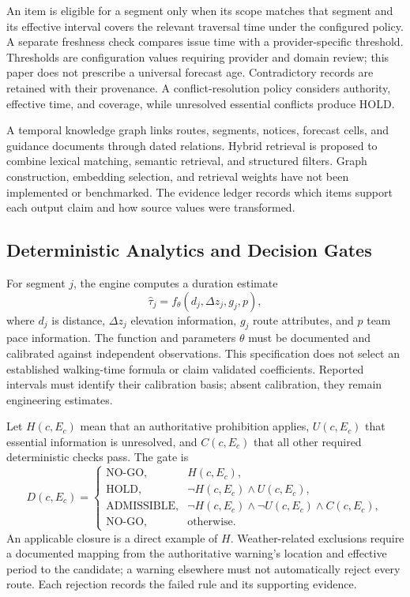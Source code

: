 \documentclass[conference]{IEEEtran}
\begin{document}
An item is eligible for a segment only when its scope matches that segment and its effective interval covers the relevant traversal time under the configured policy. A separate freshness check compares issue time with a provider-specific threshold. Thresholds are configuration values requiring provider and domain review; this paper does not prescribe a universal forecast age. Contradictory records are retained with their provenance. A conflict-resolution policy considers authority, effective time, and coverage, while unresolved essential conflicts produce HOLD.

A temporal knowledge graph links routes, segments, notices, forecast cells, and guidance documents through dated relations. Hybrid retrieval is proposed to combine lexical matching, semantic retrieval, and structured filters. Graph construction, embedding selection, and retrieval weights have not been implemented or benchmarked. The evidence ledger records which items support each output claim and how source values were transformed.

\subsection{Deterministic Analytics and Decision Gates}
For segment $j$, the engine computes a duration estimate
\begin{equation}
 \hat{\tau}_j=f_{\theta}(d_j,\Delta z_j,g_j,p),
\end{equation}
where $d_j$ is distance, $\Delta z_j$ elevation information, $g_j$ route attributes, and $p$ team pace information. The function and parameters $\theta$ must be documented and calibrated against independent observations. This specification does not select an established walking-time formula or claim validated coefficients. Reported intervals must identify their calibration basis; absent calibration, they remain engineering estimates.

Let $H(c,E_c)$ mean that an authoritative prohibition applies, $U(c,E_c)$ that essential information is unresolved, and $C(c,E_c)$ that all other required deterministic checks pass. The gate is
\begin{equation}
 D(c,E_c)=\begin{cases}
 \text{NO-GO},& H(c,E_c),\\
 \text{HOLD},& \neg H(c,E_c)\land U(c,E_c),\\
 \text{ADMISSIBLE},&\neg H(c,E_c)\land\neg U(c,E_c)\land C(c,E_c),\\
 \text{NO-GO},&\text{otherwise}.
 \end{cases}
\end{equation}
An applicable closure is a direct example of $H$. Weather-related exclusions require a documented mapping from the authoritative warning's location and effective period to the candidate; a warning elsewhere must not automatically reject every route. Each rejection records the failed rule and its supporting evidence.
\end{document}

